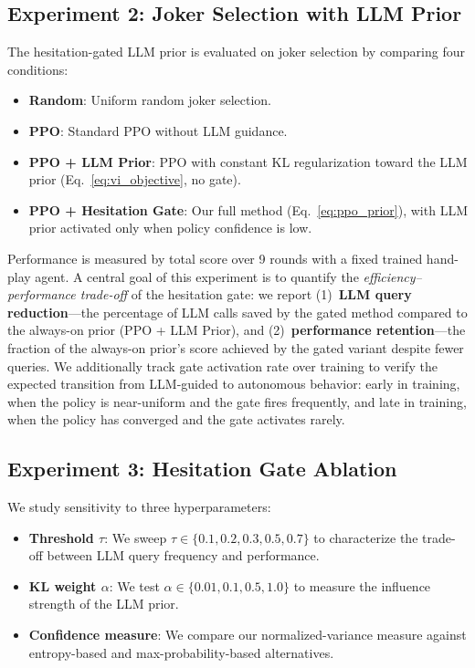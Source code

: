 \documentclass[conference]{IEEEtran}
\begin{document}
\subsection{Experiment 2: Joker Selection with LLM Prior}

The hesitation-gated LLM prior is evaluated on joker selection by comparing four conditions:
\begin{itemize}
    \item \textbf{Random}: Uniform random joker selection.
    \item \textbf{PPO}: Standard PPO without LLM guidance.
    \item \textbf{PPO + LLM Prior}: PPO with constant KL regularization toward the LLM prior (Eq.~\ref{eq:vi_objective}, no gate).
    \item \textbf{PPO + Hesitation Gate}: Our full method (Eq.~\ref{eq:ppo_prior}), with LLM prior activated only when policy confidence is low.
\end{itemize}
Performance is measured by total score over 9 rounds with a fixed trained hand-play agent.
A central goal of this experiment is to quantify the \textit{efficiency--performance trade-off} of the hesitation gate: we report
(1)~\textbf{LLM query reduction}---the percentage of LLM calls saved by the gated method compared to the always-on prior (PPO + LLM Prior), and
(2)~\textbf{performance retention}---the fraction of the always-on prior's score achieved by the gated variant despite fewer queries.
We additionally track gate activation rate over training to verify the expected transition from LLM-guided to autonomous behavior: early in training, when the policy is near-uniform and the gate fires frequently, and late in training, when the policy has converged and the gate activates rarely.

\subsection{Experiment 3: Hesitation Gate Ablation}

We study sensitivity to three hyperparameters:
\begin{itemize}
    \item \textbf{Threshold $\tau$}: We sweep $\tau \in \{0.1, 0.2, 0.3, 0.5, 0.7\}$ to characterize the trade-off between LLM query frequency and performance.
    \item \textbf{KL weight $\alpha$}: We test $\alpha \in \{0.01, 0.1, 0.5, 1.0\}$ to measure the influence strength of the LLM prior.
    \item \textbf{Confidence measure}: We compare our normalized-variance measure against entropy-based and max-probability-based alternatives.
\end{itemize}
\end{document}
